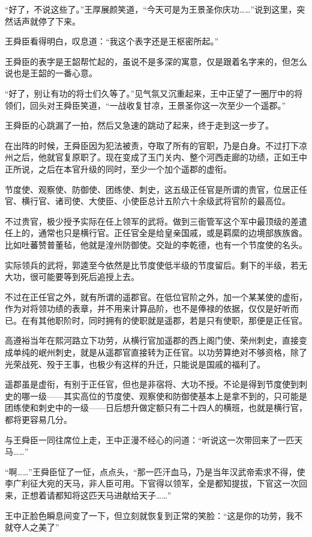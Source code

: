 “好了，不说这些了。”王厚展颜笑道，“今天可是为王景圣你庆功……”说到这里，突然话声就停了下来。

王舜臣看得明白，叹息道：“我这个表字还是王枢密所起。”

王舜臣的表字是王韶帮忙起的，虽说不是多深的寓意，仅是跟着名字来的，但怎么说也是王韶的一番心意。

“好了，别让有功的将士们久等了。”见气氛又沉重起来，王中正望了一圈厅中的将领们，回头对王舜臣笑道，“一战收复甘凉，王景圣你这一次至少一个遥郡。”

王舜臣的心跳漏了一拍，然后又急速的跳动了起来，终于走到这一步了。

在出阵的时候，王舜臣因为犯法被责，夺取了所有的官职，乃是白身。不过打下凉州之后，他就官复原职了。现在变成了玉门关内、整个河西走廊的功绩，正如王中正所说，之后在本官升级的同时，至少一个加个遥郡的虚衔。

节度使、观察使、防御使、团练使、刺史，这五级正任官是所谓的贵官，位居正任官、横行官、诸司使、大使臣、小使臣总计五阶六十余级武将官阶的最高位。

不过贵官，极少授予实际在任上领军的武将。做到三衙管军这个军中最顶级的差遣任上的，通常也只是横行官。正任官全是给皇亲国戚，或是羁縻的边境部族族酋。比如吐蕃赞普董毡，他就是湟州防御使。交趾的李乾德，也有一个节度使的名头。

实际领兵的武将，郭逵至今依然是比节度使低半级的节度留后。剩下的半级，若无大功，很可能要等到死后追授上去。

不过在正任官之外，就有所谓的遥郡官。在低位官阶之外，加一个某某使的虚衔，作为对将领功绩的表章，并不用来计算品阶，也不是俸禄的依据，仅仅是好听而已。在有其他职阶时，同时拥有的使职就是遥郡，若是只有使职，那便是正任官。

高遵裕当年在熙河路立下功劳，从横行官加遥郡的西上阁门使、荣州刺史，直接变成单纯的岷州刺史，就是从遥郡官直接转为正任官。以功劳算绝对不够资格，除了光荣战死、殁于王事，也极少有这样的升迁，只能说是国戚的福利了。

遥郡虽是虚衔，有别于正任官，但也是非宿将、大功不授。不论是得到节度使到刺史的哪一级——其实高位的节度使、观察使和防御使基本上是拿不到的，只可能是团练使和刺史中的一级——日后想升做定额只有二十四人的横班，也就是横行官，都将更容易几分。

与王舜臣一同往席位上走，王中正漫不经心的问道：“听说这一次带回来了一匹天马……”

“啊……”王舜臣怔了一怔，点点头，“那一匹汗血马，乃是当年汉武帝索求不得，使李广利征大宛的天马，非人臣可用。下官得以领军，全是都知提拔，下官这一次回来，正想着请都知将这匹天马进献给天子……”

王中正脸色瞬息间变了一下，但立刻就恢复到正常的笑脸：“这是你的功劳，我不就夺人之美了”

